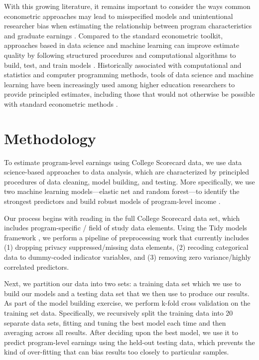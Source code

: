 \documentclass[a4paper, 12pt]{article}
\begin{document}
With this growing literature, it remains important to consider the ways common econometric approaches may lead to misspecified models and unintentional researcher bias when estimating the relationship between program characteristics and graduate earnings \parencite{Imbens_2004}. Compared to the standard econometric toolkit, approaches based in data science and machine learning can improve estimate quality by following structured procedures and computational algorithms to build, test, and train models \parencite{Hastie_etal_2016}. Historically associated with computational and statistics and computer programming methods, tools of data science and machine learning have been increasingly used among higher education researchers to provide principled estimates, including those that would not otherwise be possible with standard econometric methods \parencite{skinner2021civic, aulck2017predicting, savvas_etal_2021, Zeineddine_2021}.

\section*{Methodology}

To estimate program-level earnings using College Scorecard data, we use data science-based approaches to data analysis, which are characterized by principled procedures of data cleaning, model building, and testing. More specifically, we use two machine learning models---elastic net and random forest---to identify the strongest predictors and build robust models of program-level income \parencite{Hastie_etal_2016, Kuhn_Silge_2022}.

Our process begins with reading in the full College Scorecard data set, which includes program-specific / field of study data elements. Using the Tidy models framework \parencite{Kuhn_Silge_2022}, we perform a pipeline of preprocessing work that currently includes (1) dropping privacy suppressed/missing data elements, (2) recoding categorical data to dummy-coded indicator variables, and (3) removing zero variance/highly correlated predictors.

Next, we partition our data into two sets: a training data set which we use to build our models and a testing data set that we then use to produce our results. As part of the model building exercise, we perform k-fold cross validation on the training set data. Specifically, we recursively split the training data into 20 separate data sets, fitting and tuning the best model each time and then averaging across all results. After deciding upon the best model, we use it to predict program-level earnings using the held-out testing data, which prevents the kind of over-fitting that can bias results too closely to particular samples.
\end{document}
